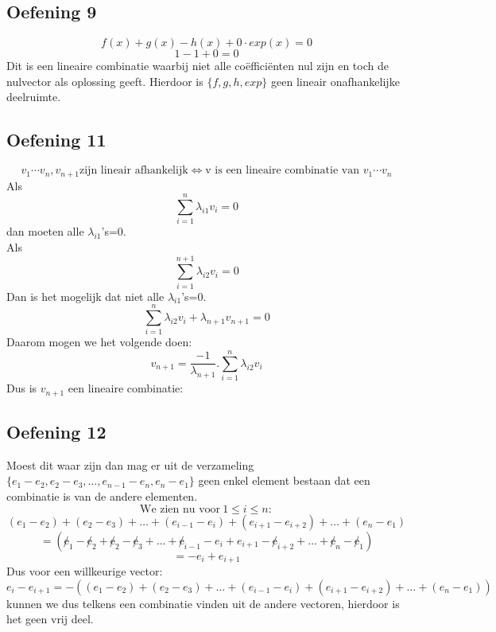 \documentclass[lineaire_algebra_oplossingen.tex]{subfiles}
\begin{document}
\subsection{Oefening 9}
$$f(x)+g(x)-h(x)+0\cdot exp(x) = 0$$
$$1 - 1 + 0 = 0$$
Dit is een lineaire combinatie waarbij niet alle co\"effici\"enten nul zijn en toch de nulvector als oplossing geeft. Hierdoor is
$\{f,g,h,exp\}$ geen lineair onafhankelijke deelruimte.

\subsection{Oefening 11}
\[v_1\cdots v_n, v_{n+1}\text{zijn lineair afhankelijk} \Leftrightarrow \text{v is een lineaire combinatie van } v_1\cdots v_n\]
Als
\[\sum_{i=1}^{n}{\lambda_{i1}v_i}=0\]
dan moeten alle $\lambda_{i1}$'s=0.\\
Als
\[\sum_{i=1}^{n+1}{\lambda_{i2}v_i}=0\]
Dan is het mogelijk dat niet alle $\lambda_{i1}$'s=0.
\[\sum_{i=1}^{n}{\lambda_{i2}v_i}+\lambda_{n+1}v_{n+1}=0\]
Daarom mogen we het volgende doen:
\[v_{n+1}=\frac{-1}{\lambda_{n+1}}.\sum_{i=1}^{n}{\lambda_{i2}v_i}\]
Dus is $v_{n+1}$ een lineaire combinatie:
 
\subsection{Oefening 12}
Moest dit waar zijn dan mag er uit de verzameling $\{ e_1-e_2,e_2-e_3,\dots ,e_{n-1}-e_n,e_n-e_1\}$ geen enkel element bestaan dat een combinatie is van de andere elementen.
$$
\text{We zien nu voor}\ 1 \leq i \leq n:
$$
$$ 
(e_1-e_2)+(e_2-e_3)+\dots +(e_{i-1}-e_i)+(e_{i+1}-e_{i+2})+\dots + (e_n - e_1)
$$
$$
= (\not e_1-\not e_2+\not e_2-\not e_3+\dots +\not e_{i-1}-e_i+e_{i+1}-\not e_{i+2}+\dots + \not e_n - \not e_1)
$$
$$
= -e_i + e_{i+1}
$$
Dus voor een willkeurige vector:
$$
e_i - e_{i+1} = -\left((e_1-e_2)+(e_2-e_3)+\dots +(e_{i-1}-e_i)+(e_{i+1}-e_{i+2})+\dots + (e_n - e_1)\right)
$$
kunnen we dus telkens een combinatie vinden uit de andere vectoren, hierdoor is het geen vrij deel. 
\end{document}
